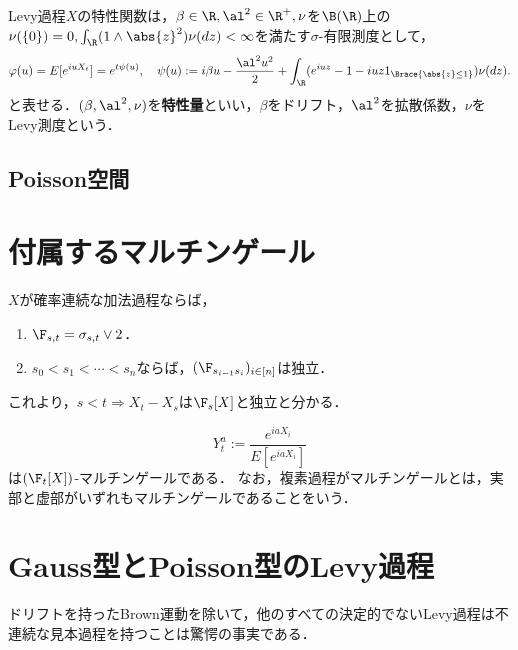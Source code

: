 \documentclass[uplatex,dvipdfmx]{jsreport}
\begin{document}
\begin{theorem}
    Levy過程$X$の特性関数は，$\beta\in\R,\al^2\in\R^+,\nu$を$\B(\R)$上の$\nu(\{0\})=0,\int_\R(1\land\abs{z}^2)\nu(dz)<\infty$を満たす$\sigma$-有限測度として，
    \[\varphi(u)=E[e^{iuX_t}]=e^{t\psi(u)},\quad\psi(u):=i\beta u-\frac{\al^2u^2}{2}+\int_\R(e^{iuz}-1-iuz1_{\Brace{\abs{z}\le1}})\nu(dz).\]
    と表せる．$(\beta,\al^2,\nu)$を\textbf{特性量}といい，$\beta$をドリフト，$\al^2$を拡散係数，$\nu$をLevy測度という．
\end{theorem}

\subsection{Poisson空間}

\section{付属するマルチンゲール}

\begin{theorem}
    $X$が確率連続な加法過程ならば，
    \begin{enumerate}
        \item $\F_{s,t}=\sigma_{s,t}\lor 2$．
        \item $s_0<s_1<\cdots<s_n$ならば，$(\F_{s_{i-1}s_i})_{i\in[n]}$は独立．
    \end{enumerate}
\end{theorem}
\begin{remarks}
    これより，$s<t\Rightarrow X_t-X_s$は$\F_s[X]$と独立と分かる．
\end{remarks}

\begin{proposition}
    \[Y^a_t:=\frac{e^{iaX_i}}{E[e^{iaX_i}]}\]
    は$(\F_t[X])$-マルチンゲールである．
    なお，複素過程がマルチンゲールとは，実部と虚部がいずれもマルチンゲールであることをいう．
\end{proposition}

\section{Gauss型とPoisson型のLevy過程}

\begin{tcolorbox}[colframe=ForestGreen, colback=ForestGreen!10!white,breakable,colbacktitle=ForestGreen!40!white,coltitle=black,fonttitle=\bfseries\sffamily,
title=]
    ドリフトを持ったBrown運動を除いて，他のすべての決定的でないLevy過程は不連続な見本過程を持つことは驚愕の事実である．
\end{tcolorbox}
\end{document}
